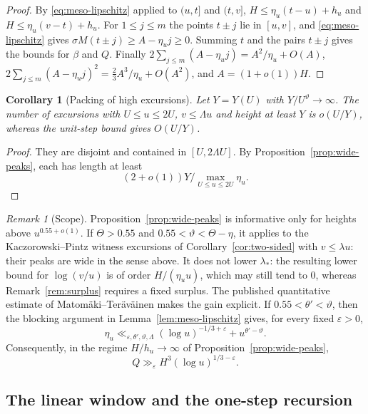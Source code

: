 \documentclass[11pt]{amsart}
\numberwithin{equation}{section}
\theoremstyle{plain}
\newtheorem{corollary}[theorem]{Corollary}
\theoremstyle{definition}
\theoremstyle{remark}
\newtheorem{remark}[theorem]{Remark}
\begin{document}
\begin{proof}
By \eqref{eq:meso-lipschitz} applied to $(u,t]$ and $(t,v]$,
$H\le\eta_u(t-u)+h_u$ and $H\le\eta_u(v-t)+h_u$. For $1\le j\le m$ the
points $t\pm j$ lie in $[u,v]$, and \eqref{eq:meso-lipschitz} gives
$\sigma M(t\pm j)\ge A-\eta_uj\ge0$. Summing $t$ and the pairs $t\pm j$
gives the bounds for $\beta$ and $Q$. Finally
$2\sum_{j\le m}(A-\eta_uj)=A^2/\eta_u+O(A)$,
$2\sum_{j\le m}(A-\eta_uj)^2=\frac23A^3/\eta_u+O(A^2)$, and $A=(1+o(1))H$.
\end{proof}

\begin{corollary}[Packing of high excursions]
\label{cor:packing}
Let $Y=Y(U)$ with $Y/U^\vartheta\to\infty$. The number of excursions with
$U\le u\le2U$, $v\le\Lambda u$ and height at least $Y$ is
$o(U/Y)$, whereas the unit-step bound gives $O(U/Y)$.
\end{corollary}

\begin{proof}
They are disjoint and contained in $[U,2\Lambda U]$. By
Proposition~\ref{prop:wide-peaks}, each has length at least
$$(2+o(1))Y/\max_{U\le u\le2U}\eta_u.$$
\end{proof}

\begin{remark}[Scope]
\label{rem:wide-peaks-scope}
Proposition~\ref{prop:wide-peaks} is informative only for heights above
$u^{0.55+o(1)}$. If $\Theta>0.55$ and $0.55<\vartheta<\Theta-\eta$, it
applies to the Kaczorowski--Pintz witness excursions of
Corollary~\ref{cor:two-sided} with $v\le\lambda u$: their peaks are wide in
the sense above. It does not lower $\lambda_*$: the resulting lower bound
for $\log(v/u)$ is of order $H/(\eta_uu)$, which may still tend to $0$,
whereas Remark~\ref{rem:surplus} requires a fixed surplus. The published
quantitative estimate of Matom\"aki--Ter\"av\"ainen
\cite[Theorem~1.1]{MatomakiTeravainen2023} makes the gain explicit. If
$0.55<\theta'<\vartheta$, then the blocking argument in
Lemma~\ref{lem:meso-lipschitz} gives, for every fixed $\varepsilon>0$,
\[
\eta_u\ll_{\varepsilon,\theta',\vartheta,\Lambda}
(\log u)^{-1/3+\varepsilon}+u^{\theta'-\vartheta}.
\]
Consequently, in the regime $H/h_u\to\infty$ of
Proposition~\ref{prop:wide-peaks},
\[
Q\gg_{\varepsilon}H^3(\log u)^{1/3-\varepsilon}.
\]
\end{remark}



\subsection{The linear window and the one-step recursion}
\label{subsec:linear-window}
\end{document}
